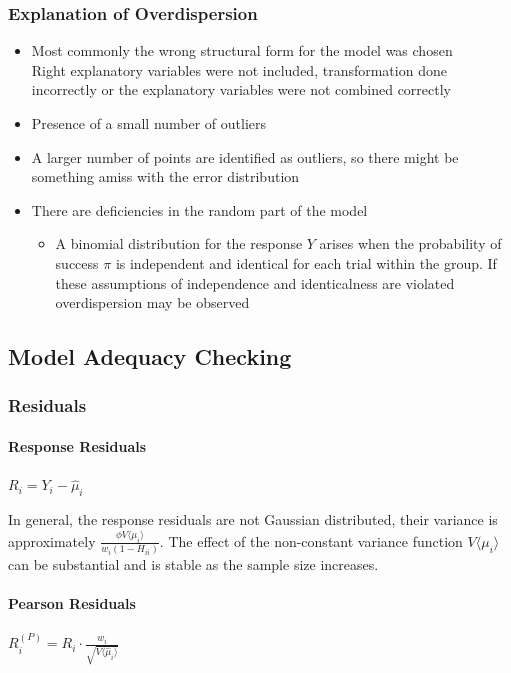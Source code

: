 \documentclass[11pt]{article}
\begin{document}
\subsubsection{Explanation of Overdispersion}
\begin{itemize}[label=-]
	\item Most commonly the wrong structural form for the model was chosen\\Right explanatory variables were not included, transformation done incorrectly or the explanatory variables were not combined correctly
	\item Presence of a small number of outliers
	\item A larger number of points are identified as outliers, so there might be something amiss with the error distribution
	\item There are deficiencies in the random part of the model
	\begin{itemize}[label=$\bullet$]
		\item A binomial distribution for the response $Y$ arises when the probability of success $\pi$ is independent and identical for each trial within the group. If these assumptions of independence and identicalness are violated overdispersion may be observed
	\end{itemize}
\end{itemize}

\subsection{Model Adequacy Checking}
\subsubsection{Residuals}
\paragraph{Response Residuals} $R_i = Y_i - \widehat{\mu}_i$

In general, the response residuals are not Gaussian distributed, their variance is approximately $\frac{\phi V\langle \mu_i \rangle}{w_i (1-H_{ii})}$. The effect of the non-constant variance function $V\langle \mu_i \rangle$ can be substantial and is stable as the sample size increases.

\paragraph{Pearson Residuals} $R_i^{(P)} = R_i \cdot \frac{w_i}{\sqrt{V\langle \widehat{\mu}_i \rangle}}$
\end{document}
